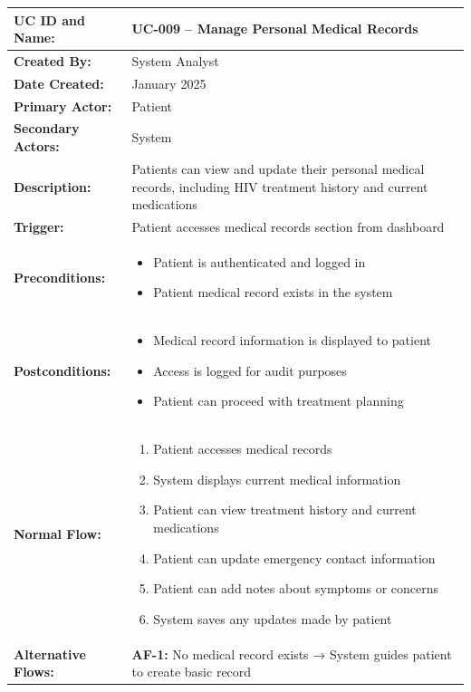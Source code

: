 \documentclass[12pt,a4paper]{article}
\begin{document}
\renewcommand{\arraystretch}{1.5}
\begin{longtable}{|p{4.5cm}|p{10.5cm}|}
\hline
\textbf{UC ID and Name:} & UC-009 – Manage Personal Medical Records \\
\hline
\textbf{Created By:} & System Analyst \\
\hline
\textbf{Date Created:} & January 2025 \\
\hline
\textbf{Primary Actor:} & Patient \\
\hline
\textbf{Secondary Actors:} & System \\
\hline
\textbf{Description:} & Patients can view and update their personal medical records, including HIV treatment history and current medications \\
\hline
\textbf{Trigger:} & Patient accesses medical records section from dashboard \\
\hline
\textbf{Preconditions:} &
\begin{itemize}
  \item Patient is authenticated and logged in
  \item Patient medical record exists in the system
\end{itemize} \\
\hline
\textbf{Postconditions:} &
\begin{itemize}
  \item Medical record information is displayed to patient
  \item Access is logged for audit purposes
  \item Patient can proceed with treatment planning
\end{itemize} \\
\hline
\textbf{Normal Flow:} &
\begin{enumerate}
  \item Patient accesses medical records
  \item System displays current medical information
  \item Patient can view treatment history and current medications
  \item Patient can update emergency contact information
  \item Patient can add notes about symptoms or concerns
  \item System saves any updates made by patient
\end{enumerate} \\
\hline
\textbf{Alternative Flows:} &
\textbf{AF-1:} No medical record exists → System guides patient to create basic record \\

\end{longtable}
\end{document}
